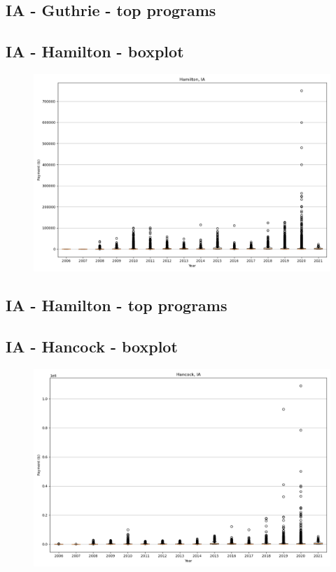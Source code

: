 \subsection*{IA - Guthrie - top programs}

\newpage
\subsection*{IA - Hamilton - boxplot}
\begin{figure}[h]
\centering
\includegraphics[width=7in]{../output/boxplots/counties/Hamilton-IA_boxplot.png}
\end{figure}


\subsection*{IA - Hamilton - top programs}

\newpage
\subsection*{IA - Hancock - boxplot}
\begin{figure}[h]
\centering
\includegraphics[width=7in]{../output/boxplots/counties/Hancock-IA_boxplot.png}
\end{figure}


